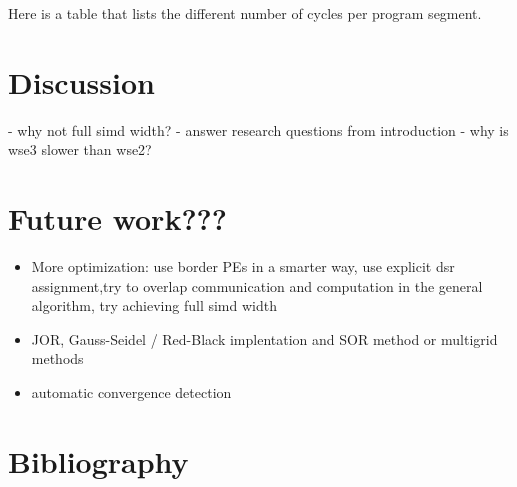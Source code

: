 \documentclass{article}
\begin{document}
Here is a table that lists the different number of cycles per program segment.


\section{Discussion}
- why not full simd width?
- answer research questions from introduction
- why is wse3 slower than wse2?

\section{Future work???}
\begin{itemize}
    \item More optimization: use border PEs in a smarter way, use explicit dsr assignment,try to overlap communication and computation in the general algorithm, try achieving full simd width
    \item JOR, Gauss-Seidel / Red-Black implentation and SOR method or multigrid methods
    \item automatic convergence detection
\end{itemize}

\section{Bibliography}
\end{document}
